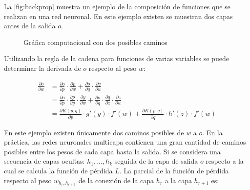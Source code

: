 La \autoref{fig:backprop} muestra un ejemplo de la composición de funciones que se realizan en una red neuronal. En este ejemplo existen se muestran dos capas antes de la salida $o$.

\begin{figure}[h]
  \centering
\caption{Gráfica computacional con dos posibles caminos \cite{Nielsen:2018}}
\label{fig:backprop}
\end{figure}

Utilizando la regla de la cadena para funciones de varias variables se puede determinar la derivada de $o$ respecto al peso $w$:

\begin{align}
  \label{eq:ugly}
\frac{\partial o}{\partial w} &= \frac{\partial o}{\partial p} \cdot \frac{\partial p}{\partial w} +  \frac{\partial o}{\partial q} \cdot \frac{\partial q}{\partial w}  \\ 
                              &=  \frac{\partial o}{\partial p}\cdot\frac{\partial p}{\partial y}\cdot\frac{\partial y}{\partial w} + \frac{\partial o}{\partial q}\cdot \frac{\partial q}{\partial z}\cdot \frac{\partial z}{\partial w}\\
                              &= \frac{\partial K(p,q)}{\partial p}\cdot g'(y)\cdot f'(w) + \frac{\partial K(p,q)}{\partial q}\cdot h'(z)\cdot f'(w)
\end{align}

En este ejemplo existen únicamente dos caminos posibles de $w$ a $o$. En la práctica, las redes neuronales multicapa contienen una gran cantidad de caminos posibles entre los pesos de cada capa hasta la salida. Si se considera una secuencia de capas ocultas: $h_1,...,h_k$ seguida de la capa de salida $o$ respecto a la cual se calcula la función de pérdida $L$. La parcial de la función de pérdida respecto al peso $w_{h_r, h_{r+1}}$ de la conexión de la capa $h_{r}$ a la capa $h_{r+1}$ es: \cite{Nielsen:2018}

